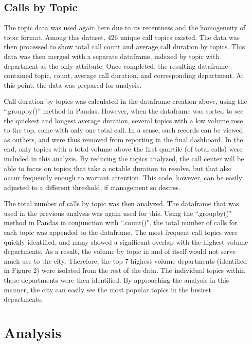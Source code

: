 \documentclass{article}
\begin{document}
	\subsection{Calls by Topic}

The topic data was used again here due to its recentness and the homogeneity of topic format.  Among this dataset, 426 unique call topics existed.  The data was then processed to show total call count and average call duration by topics.  This data was then merged with a separate dataframe, indexed by topic with department as the only attribute.  Once completed, the resulting dataframe contained topic, count, average call duration, and corresponding department.  At this point, the data was prepared for analysis.
\par
Call duration by topics was calculated in the dataframe creation above, using the ``.groupby()'' method in Pandas.  However, when the dataframe was sorted to see the quickest and longest average duration, several topics with a low volume rose to the top, some with only one total call.  In a sense, such records can be viewed as outliers, and were thus removed from reporting in the final dashboard.  In the end, only topics with a total volume above the first quartile (of total calls) were included in this analysis.  By reducing the topics analyzed, the call center will be able to focus on topics that take a notable duration to resolve, but that also occur frequently enough to warrant attention.  This code, however, can be easily adjusted to a different threshold, if management so desires.
\par
The total number of calls by topic was then analyzed.  The dataframe that was used in the previous analysis was again used for this.  Using the ``.groupby()" method in Pandas in conjunction with ``.count()", the total number of calls for each topic was appended to the dataframe.  The most frequent call topics were quickly identified, and many showed a significant overlap with the highest volume departments.  As a result, the volume by topic in and of itself would not serve much use to the city.  Therefore, the top 7 highest volume departments (identified in Figure 2) were isolated from the rest of the data.  The individual topics within these departments were then identified.  By approaching the analysis in this manner, the city can easily see the most popular topics in the busiest departments.



\section{Analysis}
\end{document}

